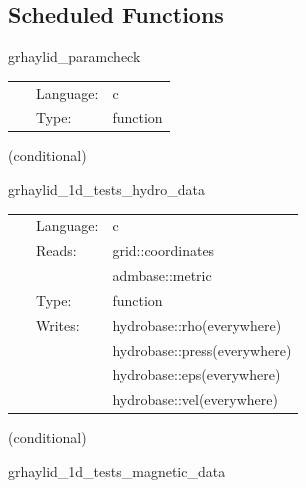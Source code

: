 \documentclass{article}
\begin{document}
\subsection*{Scheduled Functions}
\vspace{5mm}


\hspace{5mm} grhaylid\_paramcheck 

\hspace{5mm}{\it validate grhaylid producer, selector, eos, and representation contracts } 


\hspace{5mm}

 \begin{tabular*}{160mm}{cll} 
~ & Language:  & c \\ 
~ & Type:  & function \\ 
\end{tabular*} 


\vspace{5mm}

   (conditional) 

\hspace{5mm} grhaylid\_1d\_tests\_hydro\_data 

\hspace{5mm}{\it set initial hydrodynamic data for 1d test } 


\hspace{5mm}

 \begin{tabular*}{160mm}{cll} 
~ & Language:  & c \\ 
~ & Reads:  & grid::coordinates \\ 
~& ~ &admbase::metric\\ 
~ & Type:  & function \\ 
~ & Writes:  & hydrobase::rho(everywhere) \\ 
~& ~ &hydrobase::press(everywhere)\\ 
~& ~ &hydrobase::eps(everywhere)\\ 
~& ~ &hydrobase::vel(everywhere)\\ 
\end{tabular*} 


\vspace{5mm}

   (conditional) 

\hspace{5mm} grhaylid\_1d\_tests\_magnetic\_data 
\end{document}
